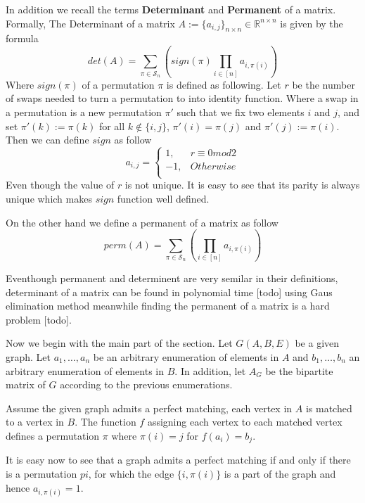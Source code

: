 In addition we recall the terms \textbf{Determinant} and \textbf{Permanent} of a matrix.
Formally, The Determinant of a matrix $A := \{a_{i, j}\}_{n \times n} \in \mathbb{R}^{n \times n}$ is given by the formula
\[
	det(A) = \sum\limits_{\pi \in \mathcal{S}_n} \left( sign(\pi) \prod\limits_{i \in [n]} a_{i, \pi(i)}  \right)
\]
Where $sign(\pi)$ of a permutation $\pi$ is defined as following.
Let $r$ be the number of swaps needed to turn a permutation to into identity function. Where a swap in a permutation is a new permutation $\pi'$ such that we fix two elements $i$ and $j$, and set $\pi'(k) := \pi(k)$ for all $k \notin \{i, j\}$, $\pi'(i) = \pi(j)$ and $\pi'(j) := \pi(i)$.
Then we can define $sign$ as follow
	\begin{equation*}
		a_{i,j} =
		\begin{cases}
			1, & r \equiv 0 mod 2\\
			-1, & Otherwise\\
		\end{cases}
	\end{equation*}
Even though the value of $r$ is not unique. It is easy to see that its parity is always unique which makes $sign$ function well defined.

On the other hand we define a permanent of a matrix as follow
\[
	perm(A) = \sum\limits_{\pi \in \mathcal{S}_n} \left( \prod\limits_{i \in [n]} a_{i, \pi(i)}  \right)
\]

Eventhough permanent and determinent are very semilar in their definitions, determinant of a matrix can be found in polynomial time [todo] using Gaus elimination method meanwhile finding the permanent of a matrix is a hard problem [todo].

Now we begin with the main part of the section. Let $G(A, B, E)$ be a given graph. Let $a_1, \dots, a_n$ be an arbitrary enumeration of elements in $A$ and $b_1, \dots, b_n$ an arbitrary enumeration of elements in $B$. In addition, let $A_G$ be the bipartite matrix of $G$ according to the previous enumerations. 

Assume the given graph admits a perfect matching, each vertex in $A$ is matched to a vertex in $B$. The function $f$ assigning each vertex to each matched vertex defines a permutation $\pi$ where $\pi(i) = j$ for $f(a_i) = b_j$.

It is easy now to see that a graph admits a perfect matching if and only if there is a permutation $pi$, for which the edge $\{i, \pi(i)\}$ is a part of the graph and hence $a_{i, \pi(i)} = 1$.

